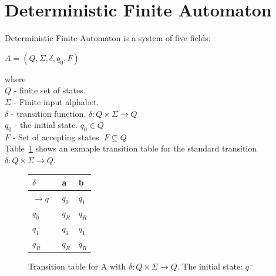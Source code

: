 \documentclass{mini}
\begin{document}
\section{Deterministic Finite Automaton} \label{sec:autom}
Deterministic Finite Automaton is a system of five fields:
\begin{center}
    $A = (Q, \Sigma, \delta, q_0, F)$
\end{center}

where \\
$Q$ - finite set of states. \\
$\Sigma$ - Finite input alphabet. \\
$\delta$ - transition function. $\delta: Q \times \Sigma \rightarrow Q$ \\
$q_0$ - the initial state. $q_0 \in Q$ \\
$F$ - Set of accepting states. $F \subseteq Q$ \\

Table~\ref{fig:ttable_std} shows an exmaple transition table for the standard transition $\delta: Q \times \Sigma \rightarrow Q$.

%
%
\begin{figure}[H]
    \CenterFloatBoxes
    \begin{floatrow}
        
        \ttabbox
        {
            \centering
            \setlength{\tabcolsep}{15pt}
            \renewcommand{\arraystretch}{1.5}
            \begin{tabular}{|P{1.0cm} || P{0.6cm} | P{0.6cm} |}
                \hline
                $\delta$ & a & b \\
                \hline
                \hline
                $\rightarrow$$q^-$ 		& $q_0$ & $q_1$ \\
                \hline
                $q_0 $ 		& $q_R$ & $q_R$ \\
                \hline
                $q_1 $ 		& $q_1$ & $q_1$ \\
                \hline
                $q_R$  					& $q_R$ & $q_R$ \\
                \hline
            \end{tabular}
        }
        {\caption{Transition table for A with $\delta: Q \times \Sigma \rightarrow Q$. The initial state: $q^-$}\label{fig:ttable_std}}
        
        
    \end{floatrow}
\end{figure}
\end{document}
